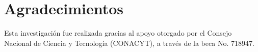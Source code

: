 
\chapter{Agradecimientos}
Esta investigación fue realizada gracias al apoyo otorgado por el Consejo Nacional de Ciencia y Tecnología (CONACYT), a través de la beca No. 718947. 